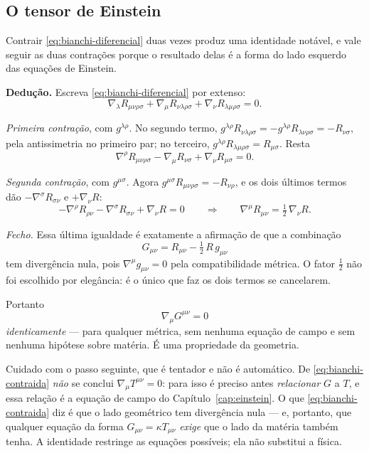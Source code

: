\documentclass[12pt,a4paper,oneside]{book}
\theoremstyle{rgplain}
\theoremstyle{rgremark}
\begin{document}
\subsection*{O tensor de Einstein}

Contrair \eqref{eq:bianchi-diferencial} duas vezes produz uma identidade
notável, e vale seguir as duas contrações porque o resultado delas é a forma
do lado esquerdo das equações de Einstein.

\begin{resultado}
\textbf{Dedução.} Escreva \eqref{eq:bianchi-diferencial} por extenso:
\[
  \nabla_\lambda R_{\mu\nu\rho\sigma}
  +\nabla_\mu R_{\nu\lambda\rho\sigma}
  +\nabla_\nu R_{\lambda\mu\rho\sigma}=0 .
\]

\emph{Primeira contração}, com $g^{\lambda\rho}$. No segundo termo,
$g^{\lambda\rho}R_{\nu\lambda\rho\sigma}
=-g^{\lambda\rho}R_{\lambda\nu\rho\sigma}=-R_{\nu\sigma}$, pela
antissimetria no primeiro par; no terceiro, $g^{\lambda\rho}
R_{\lambda\mu\rho\sigma}=R_{\mu\sigma}$. Resta
\[
  \nabla^\rho R_{\mu\nu\rho\sigma}
  -\nabla_\mu R_{\nu\sigma}+\nabla_\nu R_{\mu\sigma}=0 .
\]

\emph{Segunda contração}, com $g^{\mu\sigma}$. Agora
$g^{\mu\sigma}R_{\mu\nu\rho\sigma}=-R_{\nu\rho}$, e os dois últimos
termos dão $-\nabla^\sigma R_{\sigma\nu}$ e $+\nabla_\nu R$:
\[
  -\nabla^\rho R_{\rho\nu}-\nabla^\sigma R_{\sigma\nu}+\nabla_\nu R=0
  \qquad\Longrightarrow\qquad
  \nabla^\mu R_{\mu\nu}=\tfrac12\,\nabla_\nu R .
\]

\emph{Fecho.} Essa última igualdade é exatamente a afirmação de que a
combinação
\begin{equation}
  G_{\mu\nu}=R_{\mu\nu}-\tfrac12\,R\,g_{\mu\nu}
  \label{eq:einstein-tensor}
\end{equation}
tem divergência nula, pois $\nabla^\mu g_{\mu\nu}=0$ pela compatibilidade
métrica. O fator $\tfrac12$ não foi escolhido por elegância: é o único que
faz os dois termos se cancelarem.
\end{resultado}

Portanto
\begin{equation}
  \boxed{\ \nabla_\mu G^{\mu\nu}=0\ }
  \label{eq:bianchi-contraida}
\end{equation}
\emph{identicamente} --- para qualquer métrica, sem nenhuma equação de campo e
sem nenhuma hipótese sobre matéria. É uma propriedade da geometria.

\begin{atencao}
Cuidado com o passo seguinte, que é tentador e não é automático. De
\eqref{eq:bianchi-contraida} \emph{não} se conclui
$\nabla_\mu T^{\mu\nu}=0$: para isso é preciso antes \emph{relacionar} $G$ a
$T$, e essa relação é a equação de campo do Capítulo~\ref{cap:einstein}. O que
\eqref{eq:bianchi-contraida} diz é que o lado geométrico tem divergência nula
--- e, portanto, que qualquer equação da forma $G_{\mu\nu}=\kappa T_{\mu\nu}$
\emph{exige} que o lado da matéria também tenha. A identidade restringe as
equações possíveis; ela não substitui a física.
\end{atencao}
\end{document}
